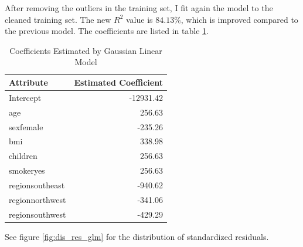 \documentclass{article}
\begin{document}
After removing the outliers in the training set, I fit again the model to the cleaned training set. The new $R^2$ value is $84.13\%$, which is improved compared to the previous model. The coefficients are listed in table \ref{tab:coef_glm}. 
\begin{table}[h]
	\centering
	\begin{tabular}{|l|r|}
		\hline
		Attribute & Estimated Coefficient \\
		\hline
		Intercept & -12931.42 \\
		\hline
		age & 256.63 \\
		\hline
		sexfemale & -235.26 \\
		\hline
		bmi & 338.98 \\
		\hline
		children & 256.63 \\
		\hline
		smokeryes & 256.63 \\
		\hline
		regionsoutheast & -940.62 \\
		\hline
		regionnorthwest & -341.06 \\
		\hline
		regionsouthwest & -429.29 \\
		\hline
	\end{tabular}
	\caption{Coefficients Estimated by Gaussian Linear Model}
	\label{tab:coef_glm}
\end{table}
See figure \ref{fig:dis_res_glm} for the distribution of standardized residuals.
\end{document}
